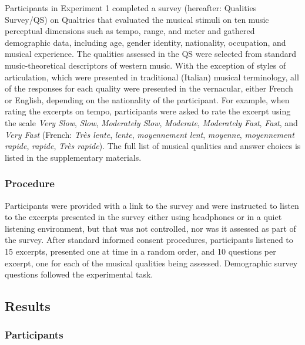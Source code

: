 \documentclass[
  english,
  man,floatsintext]{apa6}
\begin{document}
Participants in Experiment 1 completed a survey (hereafter: Qualities Survey/QS) on Qualtrics that evaluated the musical stimuli on ten music perceptual dimensions such as tempo, range, and meter and gathered demographic data, including age, gender identity, nationality, occupation, and musical experience. The qualities assessed in the QS were selected from standard music-theoretical descriptors of western music. With the exception of styles of articulation, which were presented in traditional (Italian) musical terminology, all of the responses for each quality were presented in the vernacular, either French or English, depending on the nationality of the participant. For example, when rating the excerpts on tempo, participants were asked to rate the excerpt using the scale \emph{Very Slow}, \emph{Slow}, \emph{Moderately Slow}, \emph{Moderate}, \emph{Moderately Fast}, \emph{Fast}, and \emph{Very Fast} (French: \emph{Très lente}, \emph{lente}, \emph{moyennement lent}, \emph{moyenne}, \emph{moyennement rapide}, \emph{rapide}, \emph{Très rapide}). The full list of musical qualities and answer choices is listed in the supplementary materials.

\hypertarget{procedure}{%
\subsubsection{Procedure}\label{procedure}}

Participants were provided with a link to the survey and were instructed to listen to the excerpts presented in the survey either using headphones or in a quiet listening environment, but that was not controlled, nor was it assessed as part of the survey. After standard informed consent procedures, participants listened to 15 excerpts, presented one at time in a random order, and 10 questions per excerpt, one for each of the musical qualities being assessed. Demographic survey questions followed the experimental task.

\hypertarget{results}{%
\subsection{Results}\label{results}}

\hypertarget{participants-1}{%
\subsubsection{Participants}\label{participants-1}}
\end{document}
